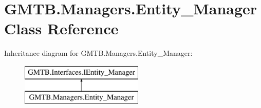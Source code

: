 \hypertarget{class_g_m_t_b_1_1_managers_1_1_entity___manager}{}\section{G\+M\+T\+B.\+Managers.\+Entity\+\_\+\+Manager Class Reference}
\label{class_g_m_t_b_1_1_managers_1_1_entity___manager}
Inheritance diagram for G\+M\+T\+B.\+Managers.\+Entity\+\_\+\+Manager\+:\begin{figure}[H]
\begin{center}
\leavevmode
\includegraphics[height=2.000000cm]{class_g_m_t_b_1_1_managers_1_1_entity___manager}
\end{center}
\end{figure}
